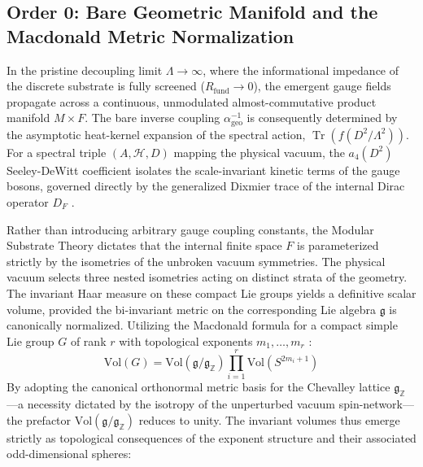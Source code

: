 \documentclass[12pt,a4paper]{article}
\begin{document}
\subsection{Order 0: Bare Geometric Manifold and the Macdonald Metric Normalization}

In the pristine decoupling limit $\Lambda \to \infty$, where the informational impedance of the discrete substrate is fully screened ($R_{\text{fund}} \to 0$), the emergent gauge fields propagate across a continuous, unmodulated almost-commutative product manifold $M \times F$. The bare inverse coupling $\alpha^{-1}_{\text{geo}}$ is consequently determined by the asymptotic heat-kernel expansion of the spectral action, $\operatorname{Tr}(f(D^2/\Lambda^2))$. For a spectral triple $(A, \mathcal{H}, D)$ mapping the physical vacuum, the $a_4(D^2)$ Seeley-DeWitt coefficient isolates the scale-invariant kinetic terms of the gauge bosons, governed directly by the generalized Dixmier trace of the internal Dirac operator $D_F$ \cite{chamseddine1997, connes1996}.

Rather than introducing arbitrary gauge coupling constants, the Modular Substrate Theory dictates that the internal finite space $F$ is parameterized strictly by the isometries of the unbroken vacuum symmetries. The physical vacuum selects three nested isometries acting on distinct strata of the geometry. The invariant Haar measure on these compact Lie groups yields a definitive scalar volume, provided the bi-invariant metric on the corresponding Lie algebra $\mathfrak{g}$ is canonically normalized. Utilizing the Macdonald formula for a compact simple Lie group $G$ of rank $r$ with topological exponents $m_1, \dots, m_r$ \cite{macdonald1980}:
\begin{equation}
\text{Vol}(G) = \text{Vol}(\mathfrak{g}/\mathfrak{g}_{\mathbb{Z}}) \prod_{i=1}^{r} \text{Vol}(S^{2m_i+1})
\end{equation}
By adopting the canonical orthonormal metric basis for the Chevalley lattice $\mathfrak{g}_{\mathbb{Z}}$—a necessity dictated by the isotropy of the unperturbed vacuum spin-network—the prefactor $\text{Vol}(\mathfrak{g}/\mathfrak{g}_{\mathbb{Z}})$ reduces to unity. The invariant volumes thus emerge strictly as topological consequences of the exponent structure and their associated odd-dimensional spheres:
\end{document}
